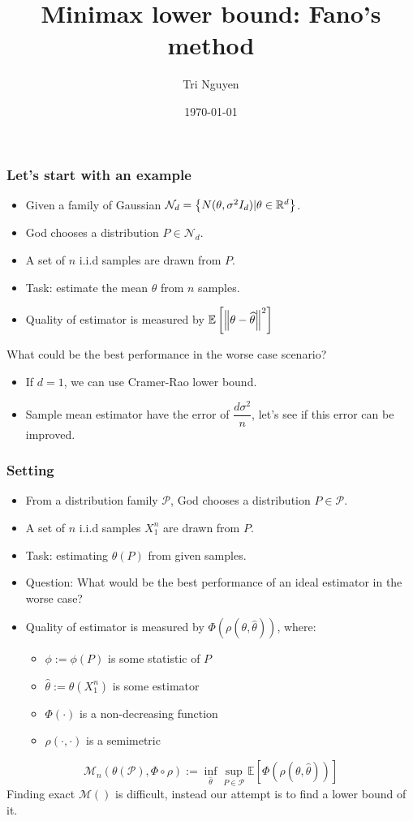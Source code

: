 \documentclass[10pt,xcolor={usenames,dvipsnames,table},aspectratio=169]{beamer}
\title[Fano's method]{Minimax lower bound: Fano's method}
\author{Tri Nguyen}
\institute[OSU] 
{
    Reading group - Summer 2022 \\
Oregon State University 
}
\date{\today} %
\begin{document}
\frame{\titlepage}


\begin{frame}
    \frametitle{Let's start with an example}
    \begin{itemize}
        \item Given a family of Gaussian $\mathcal{N}_d = \left\{N(\theta, \sigma^2 I_d) | \theta \in \mathbb{R}^{d}\right\}$.
        \item God chooses a distribution $P \in \mathcal{N}_d$.
        \item A set of $n$ i.i.d samples are drawn from  $P$. 
        \item Task: estimate the mean $\theta$ from $n$ samples.
        \item Quality of estimator is measured by $ \mathbb{E}\left[  \left\lVert\theta - \widehat{\theta}\right\rVert^2\right]$
    \end{itemize}
What could be the best performance in the worse case scenario?
\begin{itemize}
    \item If $d=1$, we can use Cramer-Rao lower bound.
    \item Sample mean estimator have the error of  $\dfrac{d\sigma^2}{n}$, let's see if this error can be improved.
\end{itemize}
\end{frame}


\begin{frame}
    \frametitle{Setting}
    \begin{itemize}
        \item From a distribution family $\mathcal{P}$, God chooses a distribution $P \in \mathcal{P}$.
        \item A set of $n$ i.i.d samples $X_1^{n}$ are drawn from  $P$.
        \item Task: estimating $\theta(P)$ from given samples.
        \item Question: What would be the best performance of an ideal estimator in the worse case?
        \item Quality of estimator is measured by $\Phi(\rho(\theta, \widehat{\theta}))$, where:
            \begin{itemize}
                \item $\phi := \phi(P)$  is some statistic of $P$
                \item  $\widehat{\theta}:=\widehat{\theta}(X_1^{n})$ is some estimator
                \item $\Phi(\cdot)$ is a non-decreasing function
                \item $\rho(\cdot, \cdot)$ is a semimetric
            \end{itemize}
    \end{itemize}
    \[
    \mathcal{M}_n(\theta(\mathcal{P}), \Phi \circ \rho) := \inf_{\widehat{\theta}} \sup_{P \in \mathcal{P}} \mathbb{E} \left[  \Phi(\rho(\theta, \widehat{\theta})) \right]
    \] 
    Finding exact $\mathcal{M}()$ is difficult, instead our attempt is to find a lower bound of it.
\end{frame}
\end{document}
